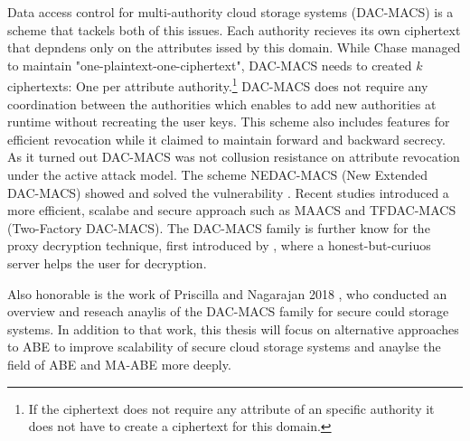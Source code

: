 \documentclass[twocolumn]{article}
\begin{document}
Data access control for multi-authority cloud storage systems (DAC-MACS) \cite{yang2013dac} is a scheme that tackels both of this issues. Each authority recieves its own ciphertext that depndens only on the attributes issed by this domain. While Chase managed to maintain "one-plaintext-one-ciphertext", DAC-MACS needs to created $k$ ciphertexts: One per attribute authority.\footnote{If the ciphertext does not require any attribute of an specific authority it does not have to create a ciphertext for this domain.} DAC-MACS does not require any coordination between the authorities which enables to add new authorities at runtime without recreating the user keys. This scheme also includes features for efficient revocation while it claimed to maintain forward and backward secrecy. As it turned out DAC-MACS was not collusion resistance on attribute revocation under the active attack model. The scheme NEDAC-MACS (New Extended DAC-MACS) showed and solved the vulnerability \cite{wu2017security}. Recent studies introduced a more efficient, scalabe and secure approach such as MAACS \cite{li2016secure} and TFDAC-MACS (Two-Factory DAC-MACS)\cite{li2017two}. The DAC-MACS family is further know for the proxy decryption technique, first introduced by \cite{li2013matrix}, where a honest-but-curiuos server helps the user for decryption.

Also honorable is the work of Priscilla and Nagarajan 2018 \cite{nagarajan2018overview}, who conducted an overview and reseach anaylis of the DAC-MACS family for secure could storage systems. In addition to that work, this thesis will focus on alternative approaches to ABE to improve scalability of secure cloud storage systems and anaylse the field of ABE and MA-ABE more deeply.    

\end{document}
